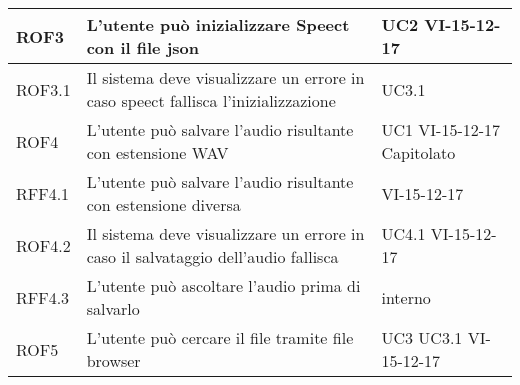 \documentclass[../AnalisideiRequisiti.tex]{subfiles}
\begin{document}
\begin{longtable}{| p{3cm} | p{6cm} | p{3cm} |}
	
		\newline ROF3&
		\newline L'utente può inizializzare Speect con il file json&
		\newline UC2 \newline VI-15-12-17
		\\[1em]	
			\hline	
		
		\newline ROF3.1&
		\newline Il sistema deve visualizzare un errore in caso speect fallisca l'inizializzazione&
		\newline UC3.1
		\\[1em]		
		\hline
		
		\newline ROF4&
		\newline L'utente può salvare l'audio risultante con estensione WAV&
		\newline UC1 \newline VI-15-12-17 \newline Capitolato
		\\[1em]
			\hline
			
		\newline RFF4.1&
		\newline L'utente può salvare l'audio risultante con estensione diversa&
		\newline VI-15-12-17
		\\[1em]
		
		\hline
		\newline ROF4.2&
		\newline Il sistema deve visualizzare un errore in caso il salvataggio dell'audio fallisca&
		\newline UC4.1 \newline VI-15-12-17
		\\[1em]
		\hline
		
		\newline RFF4.3&
		\newline L'utente può ascoltare l'audio prima di salvarlo&
		\newline interno
		\\[1em]
		\hline
		
		\newline ROF5&
		\newline L'utente può cercare il file tramite file browser&
		\newline UC3 \newline UC3.1 \newline VI-15-12-17
		\\[1em]
		\hline
		

\end{longtable}
\end{document}

